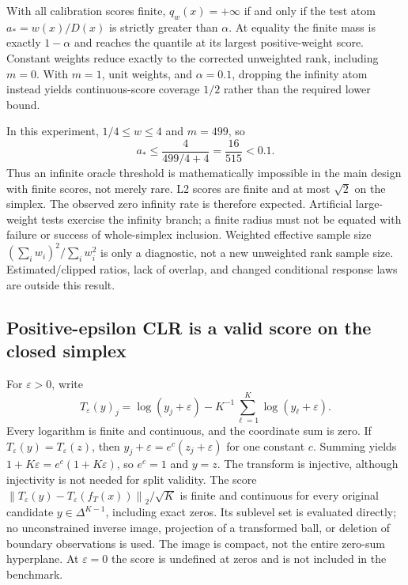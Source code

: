 \documentclass{article}
\theoremstyle{plain}
\newcommand{\simp}{\Delta^{K-1}}
\newcommand{\norm}[1]{\left\lVert #1\right\rVert}
\begin{document}
With all calibration scores finite, $q_w(x)=+\infty$ if and only if the test atom $a_*=w(x)/D(x)$ is strictly greater than $\alpha$. At equality the finite mass is exactly $1-\alpha$ and reaches the quantile at its largest positive-weight score. Constant weights reduce exactly to the corrected unweighted rank, including $m=0$. With $m=1$, unit weights, and $\alpha=0.1$, dropping the infinity atom instead yields continuous-score coverage $1/2$ rather than the required lower bound.

In this experiment, $1/4\leq w\leq4$ and $m=499$, so
\begin{equation}
 a_*\leq\frac{4}{499/4+4}=\frac{16}{515}<0.1.
 \label{eq:no-infinity}
\end{equation}
Thus an infinite oracle threshold is mathematically impossible in the main design with finite scores, not merely rare. L2 scores are finite and at most $\sqrt{2}$ on the simplex. The observed zero infinity rate is therefore expected. Artificial large-weight tests exercise the infinity branch; a finite radius must not be equated with failure or success of whole-simplex inclusion. Weighted effective sample size $(\sum_iw_i)^2/\sum_iw_i^2$ is only a diagnostic, not a new unweighted rank sample size. Estimated/clipped ratios, lack of overlap, and changed conditional response laws are outside this result.

\subsection{Positive-epsilon CLR is a valid score on the closed simplex}
For $\varepsilon>0$, write
\begin{equation}
 T_\varepsilon(y)_j=\log(y_j+\varepsilon)-K^{-1}\sum_{\ell=1}^K\log(y_\ell+\varepsilon).
 \label{eq:clr}
\end{equation}
Every logarithm is finite and continuous, and the coordinate sum is zero. If $T_\varepsilon(y)=T_\varepsilon(z)$, then $y_j+\varepsilon=e^c(z_j+\varepsilon)$ for one constant $c$. Summing yields $1+K\varepsilon=e^c(1+K\varepsilon)$, so $e^c=1$ and $y=z$. The transform is injective, although injectivity is not needed for split validity. The score $\norm{T_\varepsilon(y)-T_\varepsilon(f_T(x))}_2/\sqrt K$ is finite and continuous for every original candidate $y\in\simp$, including exact zeros. Its sublevel set is evaluated directly; no unconstrained inverse image, projection of a transformed ball, or deletion of boundary observations is used. The image is compact, not the entire zero-sum hyperplane. At $\varepsilon=0$ the score is undefined at zeros and is not included in the benchmark.
\end{document}
